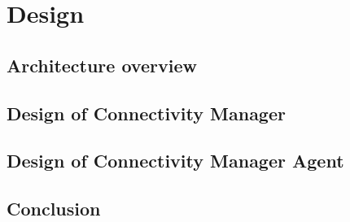 \chapter{Design}

\section{Architecture overview}

\section{Design of Connectivity Manager}

\section{Design of Connectivity Manager Agent}

\section{Conclusion}